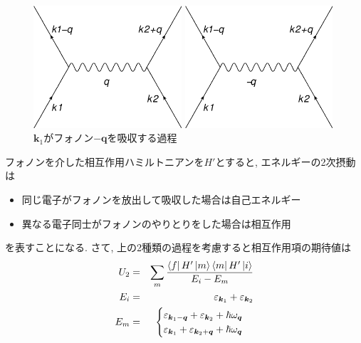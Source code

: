 \documentclass[10.5pt,a4paper]{jreport}
\makeatletter
\newcommand{\figcaption}[1]{\def\@captype{figure}\caption{#1}} %
\makeatother
\begin{document}
\begin{figure}[htbp]
  \begin{minipage}{0.5\hsize}
    \centering
    \includegraphics[width = 5.5cm]{./EPS/newdiagram1.eps}
    \figcaption{$\bm{k}_1$がフォノン$\bm{q}$を放出する過程}
    \label{diagram1}
  \end{minipage}
  \begin{minipage}{0.5\hsize}
    \centering
    \includegraphics[width = 5.5cm]{./EPS/newdiagram2.eps}
    \figcaption{$\bm{k}_1$がフォノン$\bm{-q}$を吸収する過程}
    \label{diagram2}
  \end{minipage}
\end{figure}
フォノンを介した相互作用ハミルトニアンを$H'$とすると, エネルギーの2次摂動は
\begin{itemize}
\item 同じ電子がフォノンを放出して吸収した場合は自己エネルギー
\item 異なる電子同士がフォノンのやりとりをした場合は相互作用
\end{itemize}
を表すことになる. さて, 上の2種類の過程を考慮すると相互作用項の期待値は
\begin{eqnarray}
  U_2 &=& \sum_m\frac{\bra{f}H'\ket{m}\bra{m}H'\ket{i}}{E_i-E_m}\\
  E_i &=& \varepsilon_{\bm{k}_1} +\varepsilon_{\bm{k}_2}\\
  E_m &=&
  \begin{cases}
    \varepsilon_{\bm{k}_1 - \bm{q}} +\varepsilon_{\bm{k}_2} + \hbar\omega_{\bm{q}}\\
    \varepsilon_{\bm{k}_1} +\varepsilon_{\bm{k}_2 + \bm{q}} + \hbar\omega_{\bm{q}}
  \end{cases}
\end{eqnarray}
\end{document}

